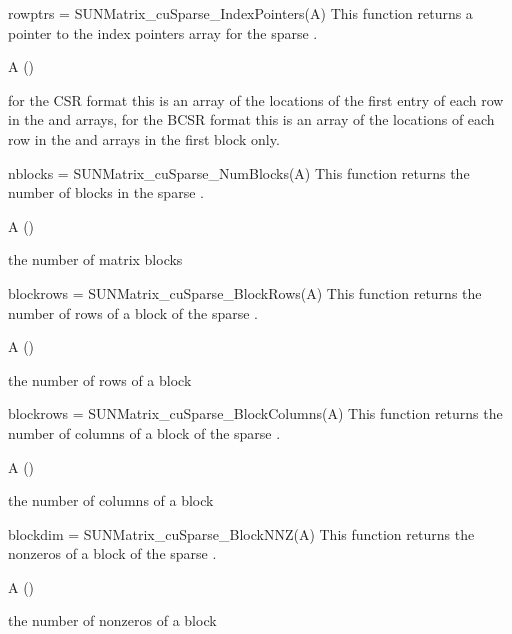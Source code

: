 {
  rowptrs = SUNMatrix\_cuSparse\_IndexPointers(A)
}
{
  This function returns a pointer to the index pointers array for the
  sparse .
}
{
  \begin{args}
  \item[A] ()
  \end{args}
}
{
  for the CSR format this is an array of the locations
  of the first entry of each row in the  and  arrays,
  for the BCSR format this is an array of the locations of each row in the
   and  arrays in the first block only.
}
{}

{
  nblocks = SUNMatrix\_cuSparse\_NumBlocks(A)
}
{
  This function returns the number of blocks in the sparse .
}
{
  \begin{args}
  \item[A] ()
  \end{args}
}
{
  the number of matrix blocks
}
{}


{
  blockrows = SUNMatrix\_cuSparse\_BlockRows(A)
}
{
  This function returns the number of rows of a
  block of the sparse .
}
{
  \begin{args}
  \item[A] ()
  \end{args}
}
{
  the number of rows of a block
}
{}


{
  blockrows = SUNMatrix\_cuSparse\_BlockColumns(A)
}
{
  This function returns the number of columns of a
  block of the sparse .
}
{
  \begin{args}
  \item[A] ()
  \end{args}
}
{
  the number of columns of a block
}
{}


{
  blockdim = SUNMatrix\_cuSparse\_BlockNNZ(A)
}
{
  This function returns the nonzeros of a block of the sparse .
}
{
  \begin{args}
  \item[A] ()
  \end{args}
}
{
  the number of nonzeros of a block
}
{}

